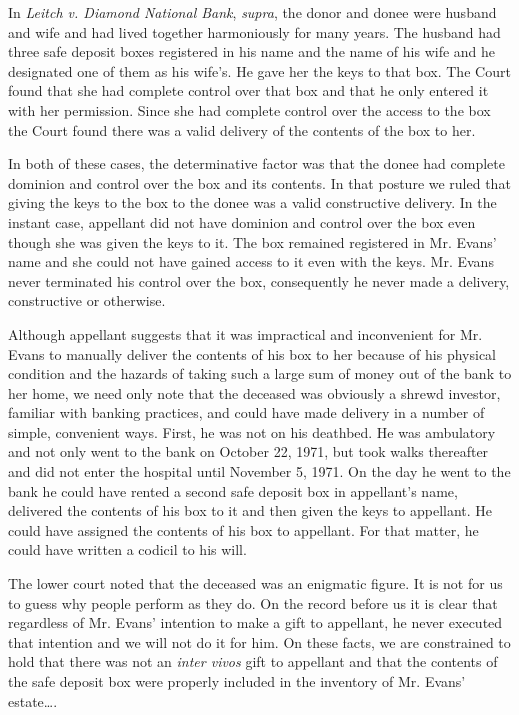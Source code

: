 In \emph{Leitch v. Diamond National Bank}, \emph{supra}, the donor and donee
were husband and
wife and had lived together harmoniously for many years. The husband had three
safe deposit boxes registered in his name and the name of his wife and he
designated one of them as his wife's. He gave her the keys to that box. The
Court found that she had complete control over that box and that he only
entered it with her permission. Since she had complete control over the access
to the box the Court found there was a valid delivery of the contents of the
box to her.

 In both of these cases, the determinative factor was that the donee had
complete dominion and control over the box and its contents. In that posture we
ruled that giving the keys to the box to the donee was a valid constructive
delivery. In the instant case, appellant did not have dominion and control over
the box even though she was given the keys to it. The box remained registered
in Mr. Evans' name and she could not have gained access to it even with the
keys. Mr. Evans never terminated his control over the box, consequently he
never made a delivery, constructive or otherwise.

 Although appellant suggests that it was impractical and inconvenient for Mr.
Evans to manually deliver the contents of his box to her because of his
physical condition and the hazards of taking such a large sum of money out of
the bank to her home, we need only note that the deceased was obviously a
shrewd investor, familiar with banking practices, and could have made delivery
in a number of simple, convenient ways. First, he was not on his deathbed. He
was ambulatory and not only went to the bank on October 22, 1971, but took
walks thereafter and did not enter the hospital until November 5, 1971. On the
day he went to the bank he could have rented a second safe deposit box in
appellant's name, delivered the contents of his box to it and then given the
keys to appellant. He could have assigned the contents of his box to appellant.
For that matter, he could have written a codicil to his will.

 The lower court noted that the deceased was an enigmatic figure. It is not for
us to guess why people perform as they do. On the record before us it is clear
that regardless of Mr. Evans' intention to make a gift to appellant, he never
executed that intention and we will not do it for him. On these facts, we are
constrained to hold that there was not an \textit{inter vivos} gift to
appellant and that the contents of the safe deposit box were properly included
in the inventory of Mr. Evans' estate\dots.

